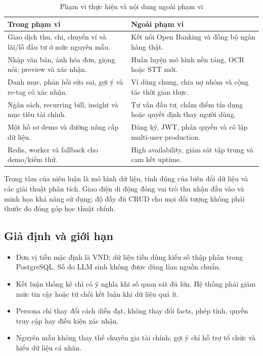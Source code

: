 \begin{table}[H]
  \centering
  \caption{Phạm vi thực hiện và nội dung ngoài phạm vi}
  \label{tab:scope}
  \begin{tabularx}{\textwidth}{@{}Y Y@{}}
    \toprule
    \textbf{Trong phạm vi} & \textbf{Ngoài phạm vi} \\
    \midrule
    Giao dịch thu, chi, chuyển ví và lãi/lỗ đầu tư ở mức nguyên mẫu. & Kết nối Open Banking và đồng bộ ngân hàng thật. \\
    Nhập văn bản, ảnh hóa đơn, giọng nói; preview và xác nhận. & Huấn luyện mô hình nền tảng, OCR hoặc STT mới. \\
    Danh mục, phản hồi sửa sai, gợi ý và re-tag có xác nhận. & Ví dùng chung, chia nợ nhóm và cộng tác thời gian thực. \\
    Ngân sách, recurring bill, insight và mục tiêu tài chính. & Tư vấn đầu tư, chấm điểm tín dụng hoặc quyết định thay người dùng. \\
    Một hồ sơ demo  và đường nâng cấp dữ liệu. & Đăng ký, JWT, phân quyền và cô lập multi-user production. \\
    Redis, worker và fallback cho demo/kiểm thử. & High availability, giám sát tập trung và cam kết uptime. \\
    \bottomrule
  \end{tabularx}
\end{table}

Trọng tâm của niên luận là mô hình dữ liệu, tính đúng của biến đổi dữ liệu và các giải thuật phân tích. Giao diện di động đóng vai trò thu nhận đầu vào và minh họa khả năng sử dụng; độ đầy đủ CRUD cho mọi đối tượng không phải thước đo đóng góp học thuật chính.

\subsection{Giả định và giới hạn}

\begin{itemize}
  \item Đơn vị tiền mặc định là VND; dữ liệu tiền dùng kiểu số thập phân trong PostgreSQL. Số do LLM sinh không được dùng làm nguồn chuẩn.
  \item Kết luận thống kê chỉ có ý nghĩa khi số quan sát đủ lớn. Hệ thống phải giảm mức tin cậy hoặc từ chối kết luận khi dữ liệu quá ít.
  \item Persona chỉ thay đổi cách diễn đạt, không thay đổi facts, phép tính, quyền truy cập hay điều kiện xác nhận.
  \item Nguyên mẫu không thay thế chuyên gia tài chính; gợi ý chỉ hỗ trợ tổ chức và hiểu dữ liệu cá nhân.
\end{itemize}

